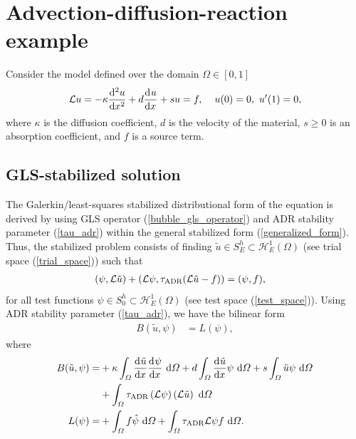 
\section{Advection-diffusion-reaction example}

Consider the model defined over the domain $\Omega \in [0,1]$
\begin{align}
  \label{bubble_example_2}
  \Lu u = -\kappa \totder[2]{u}{x} + d \totder{u}{x} + su = f, \hspace{4mm} u(0) = 0,\ u'(1) = 0,
\end{align}
where $\kappa$ is the diffusion coefficient, $d$ is the velocity of the material, $s \geq 0$ is an absorption coefficient, and $f$ is a source term.

\subsection{GLS-stabilized solution}

The Galerkin/least-squares  stabilized distributional form of the equation is derived by using GLS operator (\ref{bubble_gls_operator}) and ADR stability parameter (\ref{tau_adr}) within the general stabilized form (\ref{generalized_form}).  Thus, the stabilized problem consists of finding $\tilde{u} \in S_E^h \subset \mathcal{H}_E^1(\Omega)$ (see trial space (\ref{trial_space})) such that
\begin{align*}
  (\psi, \mathcal{L} \tilde{u}) + (\mathcal{L} \psi, \tau_{\text{ADR}} (\mathcal{L} \tilde{u} - f)) &= (\psi, f),
\end{align*}
for all test functions $\psi \in S_0^h \subset \mathcal{H}_E^1(\Omega)$ (see test space (\ref{test_space})).  Using ADR stability parameter (\ref{tau_adr}), we have the bilinear form
\begin{align*}
  B(\tilde{u},\psi) &= L(\psi),
\end{align*}
where
\begin{align*}
  B(\tilde{u}, \psi) = &+ \kappa \int_{\varOmega} \frac{\mathrm{d}^{} \tilde{u}}{\mathrm{d} x^{} } \frac{\mathrm{d}^{} \psi}{\mathrm{d} x^{} } \ \mathrm{d}\varOmega + d \int_{\varOmega} \frac{\mathrm{d}^{} \tilde{u}}{\mathrm{d} x^{} } \psi \ \mathrm{d}\varOmega + s\int_{\varOmega} \tilde{u} \psi \ \mathrm{d}\varOmega \\
  &+ \int_{\varOmega} \tau_{\text{ADR}} \left( \mathcal{L} \psi \right) \left( \mathcal{L} \tilde{u} \right) \ \mathrm{d}\varOmega \\
  L(\psi) = &+ \int_{\varOmega} f \hat{\psi} \ \mathrm{d}\varOmega + \int_{\varOmega} \tau_{\text{ADR}} \mathcal{L} \psi f \ \mathrm{d}\varOmega.
\end{align*}

